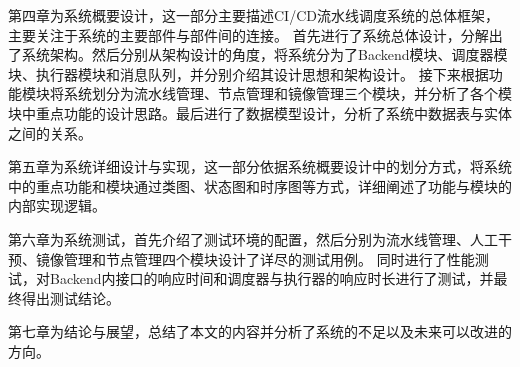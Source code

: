 第四章为系统概要设计，这一部分主要描述CI/CD流水线调度系统的总体框架，主要关注于系统的主要部件与部件间的连接。
首先进行了系统总体设计，分解出了系统架构。然后分别从架构设计的角度，将系统分为了Backend模块、调度器模块、执行器模块和消息队列，并分别介绍其设计思想和架构设计。
接下来根据功能模块将系统划分为流水线管理、节点管理和镜像管理三个模块，并分析了各个模块中重点功能的设计思路。最后进行了数据模型设计，分析了系统中数据表与实体之间的关系。

第五章为系统详细设计与实现，这一部分依据系统概要设计中的划分方式，将系统中的重点功能和模块通过类图、状态图和时序图等方式，详细阐述了功能与模块的内部实现逻辑。

第六章为系统测试，首先介绍了测试环境的配置，然后分别为流水线管理、人工干预、镜像管理和节点管理四个模块设计了详尽的测试用例。
同时进行了性能测试，对Backend内接口的响应时间和调度器与执行器的响应时长进行了测试，并最终得出测试结论。

第七章为结论与展望，总结了本文的内容并分析了系统的不足以及未来可以改进的方向。